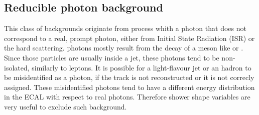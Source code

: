 
\subsection{Reducible photon background}
This class of backgrounds originate from process whith a photon that does not correspond to a real, prompt photon, either from Initial State Radiation (ISR) or the hard scattering.
\Nonprompt photons mostly result from the decay of a meson like \PGpz or \PGh.
Since those particles are usually inside a jet, these photons tend to be non-isolated, similarly to \nonprompt leptons.
It is possible for a light-flavour jet or an hadron to be misidentified as a photon, if the track is not reconstructed or it is not correcly assigned.
These misidentified photons tend to have a different energy distribution in the ECAL with respect to real photons.
Therefore shower shape variables are very useful to exclude such background.


